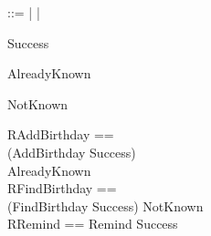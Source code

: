 \documentclass{article}
\begin{document}
\begin{zed} 
     ::=  |  | 
\end{zed}


\begin{schema}{Success}
\where
\end{schema}


\begin{schema}{AlreadyKnown}
     \\
\where
\end{schema}


\begin{schema}{NotKnown}
     \\
\where
\end{schema}

\begin{zed} 
    RAddBirthday ==\\ (AddBirthday \land Success)\\  \lor AlreadyKnown \\
    RFindBirthday ==\\ (FindBirthday \land Success) \lor NotKnown \\
    RRemind == Remind \land Success
\end{zed}
\end{document}
